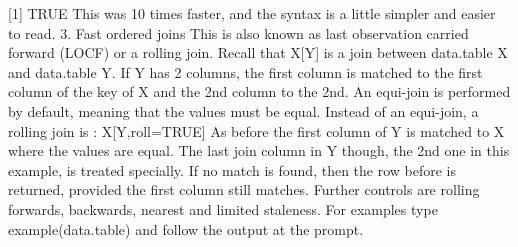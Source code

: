 [1] TRUE
This was 10 times faster, and the syntax is a little simpler and easier to read.
3. Fast ordered joins
This is also known as last observation carried forward (LOCF) or a rolling join.
Recall that X[Y] is a join between data.table X and data.table Y. If Y has 2 columns, the
first column is matched to the first column of the key of X and the 2nd column to the 2nd. An
equi-join is performed by default, meaning that the values must be equal.
Instead of an equi-join, a rolling join is :
X[Y,roll=TRUE]
As before the first column of Y is matched to X where the values are equal. The last join column
in Y though, the 2nd one in this example, is treated specially. If no match is found, then the row
before is returned, provided the first column still matches.
Further controls are rolling forwards, backwards, nearest and limited staleness.
For examples type example(data.table) and follow the output at the prompt.
